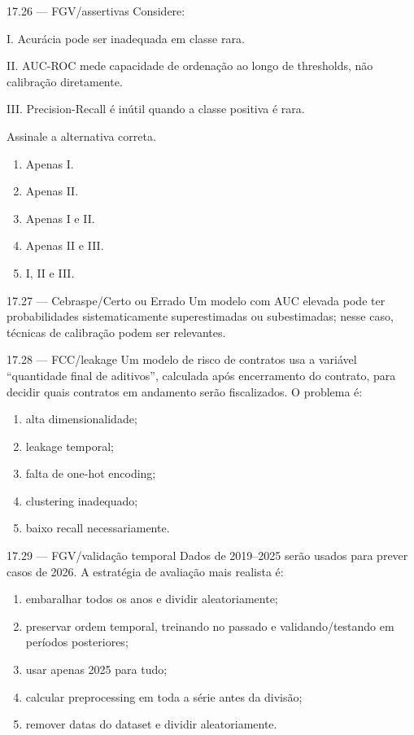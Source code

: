 \begin{questao}{ 17.26 — FGV/assertivas}
Considere:

I. Acurácia pode ser inadequada em classe rara.

II. AUC-ROC mede capacidade de ordenação ao longo de thresholds, não calibração diretamente.

III. Precision-Recall é inútil quando a classe positiva é rara.

Assinale a alternativa correta.
\begin{enumerate}[label=\Alph*)]
\item Apenas I.
\item Apenas II.
\item Apenas I e II.
\item Apenas II e III.
\item I, II e III.
\end{enumerate}
\end{questao}

\begin{questao}{ 17.27 — Cebraspe/Certo ou Errado}
Um modelo com AUC elevada pode ter probabilidades sistematicamente superestimadas ou subestimadas; nesse caso, técnicas de calibração podem ser relevantes.
\end{questao}

\begin{questao}{ 17.28 — FCC/leakage}
Um modelo de risco de contratos usa a variável ``quantidade final de aditivos'', calculada após encerramento do contrato, para decidir quais contratos em andamento serão fiscalizados. O problema é:
\begin{enumerate}[label=\Alph*)]
\item alta dimensionalidade;
\item leakage temporal;
\item falta de one-hot encoding;
\item clustering inadequado;
\item baixo recall necessariamente.
\end{enumerate}
\end{questao}

\begin{questao}{ 17.29 — FGV/validação temporal}
Dados de 2019--2025 serão usados para prever casos de 2026. A estratégia de avaliação mais realista é:
\begin{enumerate}[label=\Alph*)]
\item embaralhar todos os anos e dividir aleatoriamente;
\item preservar ordem temporal, treinando no passado e validando/testando em períodos posteriores;
\item usar apenas 2025 para tudo;
\item calcular preprocessing em toda a série antes da divisão;
\item remover datas do dataset e dividir aleatoriamente.
\end{enumerate}
\end{questao}

